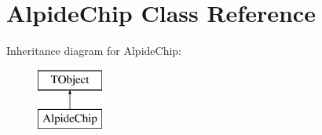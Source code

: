 \hypertarget{class_alpide_chip}{}\section{Alpide\+Chip Class Reference}
\label{class_alpide_chip}
Inheritance diagram for Alpide\+Chip\+:\begin{figure}[H]
\begin{center}
\leavevmode
\includegraphics[height=2.000000cm]{class_alpide_chip}
\end{center}
\end{figure}
